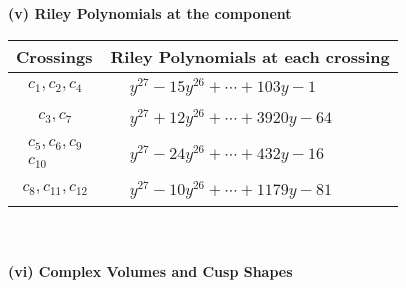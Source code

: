 \documentclass[1p]{elsarticle_modified}
\theoremstyle{definition}
\begin{document}
\newpage\renewcommand{\arraystretch}{1}
\flushleft \textbf{(v) Riley Polynomials at the component}\newline \\
\begin{tabular}{m{50pt}|m{274pt}}
Crossings & \hspace{64pt}Riley Polynomials at each crossing \\
\hline $$\begin{aligned}c_{1},c_{2},c_{4}\end{aligned}$$&$\begin{aligned}
&y^{27}-15 y^{26}+\cdots+103 y-1
\end{aligned}$\\
\hline $$\begin{aligned}c_{3},c_{7}\end{aligned}$$&$\begin{aligned}
&y^{27}+12 y^{26}+\cdots+3920 y-64
\end{aligned}$\\
\hline $$\begin{aligned}c_{5},c_{6},c_{9}\\c_{10}\end{aligned}$$&$\begin{aligned}
&y^{27}-24 y^{26}+\cdots+432 y-16
\end{aligned}$\\
\hline $$\begin{aligned}c_{8},c_{11},c_{12}\end{aligned}$$&$\begin{aligned}
&y^{27}-10 y^{26}+\cdots+1179 y-81
\end{aligned}$\\
\hline
\end{tabular}\\~\\
\newpage\flushleft \textbf{(vi) Complex Volumes and Cusp Shapes}
\end{document}
